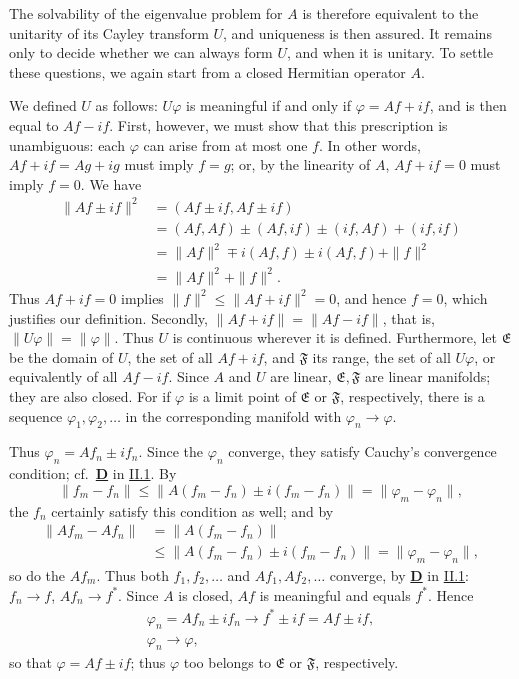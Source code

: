 \documentclass[fontsize=13pt,twoside,openany,headings=normal,parskip=false,bookmarkpackage=false,DIV=calc]{scrbook}
\begin{document}
The solvability of the eigenvalue problem for $A$ is therefore equivalent to the unitarity of its Cayley transform $U$, and uniqueness is then assured. It remains only to decide whether we can always form $U$, and when it is unitary. To settle these questions, we again start from a closed Hermitian operator $A$.

We defined $U$ as follows: $U\varphi$ is meaningful if and only if $\varphi=Af+if$, and is then equal to $Af-if$. First, however, we must show that this prescription is unambiguous: each $\varphi$ can arise from at most one $f$. In other words, $Af+if=Ag+ig$ must imply $f=g$; or, by the linearity of $A$, $Af+if=0$ must imply $f=0$. We have
\begin{align*}
\|Af\pm if\|^2&=(Af\pm if,Af\pm if)\\
&=(Af,Af)\pm(Af,if)\pm(if,Af)+(if,if)\\
&=\|Af\|^2\mp i(Af,f)\pm i(Af,f)+\|f\|^2\\
&=\|Af\|^2+\|f\|^2.
\end{align*}
Thus $Af+if=0$ implies $\|f\|^2\leq\|Af+if\|^2=0$, and hence $f=0$, which justifies our definition. Secondly, $\|Af+if\|=\|Af-if\|$, that is, $\|U\varphi\|=\|\varphi\|$. Thus $U$ is continuous wherever it is defined. Furthermore, let $\mathfrak E$ be the domain of $U$, the set of all $Af+if$, and $\mathfrak F$ its range, the set of all $U\varphi$, or equivalently of all $Af-if$. Since $A$ and $U$ are linear, $\mathfrak E,\mathfrak F$ are linear manifolds; they are also closed. For if $\varphi$ is a limit point of $\mathfrak E$ or $\mathfrak F$, respectively, there is a sequence $\varphi_1,\varphi_2,\ldots$ in the corresponding manifold with $\varphi_n\to\varphi$.

\hypertarget{origpage-85}{}%
Thus $\varphi_n=Af_n\pm if_n$. Since the $\varphi_n$ converge, they satisfy Cauchy's convergence condition; cf.\ \hyperref[ax:II.D]{\textbf{D}} in \hyperref[sec:II.1]{II.1}. By
\[
\|f_m-f_n\|\leq\|A(f_m-f_n)\pm i(f_m-f_n)\|=\|\varphi_m-\varphi_n\|,
\]
the $f_n$ certainly satisfy this condition as well; and by
\begin{align*}
\|Af_m-Af_n\|&=\|A(f_m-f_n)\|\\
&\leq\|A(f_m-f_n)\pm i(f_m-f_n)\|=\|\varphi_m-\varphi_n\|,
\end{align*}
so do the $Af_m$. Thus both $f_1,f_2,\ldots$ and $Af_1,Af_2,\ldots$ converge, by \hyperref[ax:II.D]{\textbf{D}} in \hyperref[sec:II.1]{II.1}: $f_n\to f$, $Af_n\to f^*$. Since $A$ is closed, $Af$ is meaningful and equals $f^*$. Hence
\begin{gather*}
\varphi_n=Af_n\pm if_n\to f^*\pm if=Af\pm if,\\
\varphi_n\to\varphi,
\end{gather*}
so that $\varphi=Af\pm if$; thus $\varphi$ too belongs to $\mathfrak E$ or $\mathfrak F$, respectively.
\end{document}
